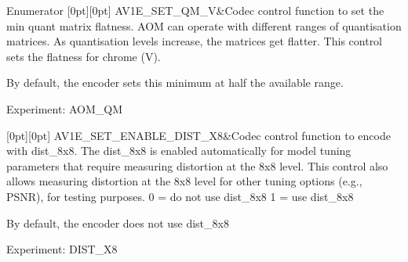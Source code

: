 \begin{DoxyEnumFields}{Enumerator}
[0pt][0pt]{}\mbox{\label{group__aom__encoder_ggae78dde67a6d78f332e9bdba0dde42db5a458d60628603d6c1c670d7d051634864}} 
A\+V1\+E\+\_\+\+S\+E\+T\+\_\+\+Q\+M\+\_\+V&Codec control function to set the min quant matrix flatness. A\+OM can operate with different ranges of quantisation matrices. As quantisation levels increase, the matrices get flatter. This control sets the flatness for chrome (V).

By default, the encoder sets this minimum at half the available range.

Experiment\+: A\+O\+M\+\_\+\+QM \\
\hline

[0pt][0pt]{}\mbox{\label{group__aom__encoder_ggae78dde67a6d78f332e9bdba0dde42db5a7ef16c780349c5fee8281f1e5b4a6718}} 
A\+V1\+E\+\_\+\+S\+E\+T\+\_\+\+E\+N\+A\+B\+L\+E\+\_\+\+D\+I\+S\+T\+\_\+X8&Codec control function to encode with dist\+\_\+8x8. The dist\+\_\+8x8 is enabled automatically for model tuning parameters that require measuring distortion at the 8x8 level. This control also allows measuring distortion at the 8x8 level for other tuning options (e.\+g., P\+S\+NR), for testing purposes. 0 = do not use dist\+\_\+8x8 1 = use dist\+\_\+8x8

By default, the encoder does not use dist\+\_\+8x8

Experiment\+: D\+I\+S\+T\+\_\+X8 \\
\hline


\end{DoxyEnumFields}
